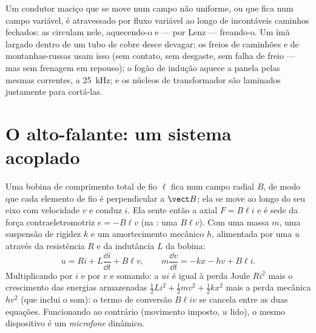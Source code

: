 \begin{example}\label{ex:b1:induction:eddy}
Um condutor maciço que se move num campo não uniforme, ou que fica num campo
variável, é atravessado por fluxo variável ao longo de incontáveis caminhos fechados:
as \emph{} circulam nele, aquecendo-o e --- por Lenz ---
freando-o. Um ímã largado dentro de um tubo de cobre desce devagar; os
freios de caminhões e de montanhas-russas usam isso (sem contato, sem desgaste, sem
falha de freio --- mas sem frenagem em repouso); o fogão de indução aquece
a panela pelas mesmas correntes, a \qty{25}{kHz}; e os núcleos de transformador são
laminados justamente para cortá-las.
\end{example}

\section{O alto-falante: um sistema acoplado}

\begin{proposition}\label{prop:b1:induction:loudspeaker}
Uma bobina de comprimento total de fio $\ell$ fica num campo radial $B$, de modo que
cada elemento de fio é perpendicular a $\vect B$; ela se move ao longo do seu
eixo com velocidade $v$ e conduz $i$. Ela sente então a  axial
$F = B\ell i$ e é sede da força contraeletromotriz $e = -B\ell v$ (na : uma  $B\ell v$). Com uma massa $m$, uma suspensão de
rigidez $k$ e um amortecimento mecânico $h$, alimentada por uma  $u$ através
da resistência $R$ e da indutância $L$ da bobina:
\[
u = Ri + L\frac{\dd i}{\dd t} + B\ell v , \qquad
m\frac{\dd v}{\dd t} = -kx - hv + B\ell i .
\]
Multiplicando por $i$ e por $v$ e somando: a  $ui$
é igual à perda Joule $Ri^2$ mais o crescimento das energias armazenadas
$\tfrac12Li^2 + \tfrac12mv^2 + \tfrac12kx^2$ mais a perda mecânica
$hv^2$ (que inclui o som): o termo de conversão $B\ell iv$ se cancela
entre as duas equações. Funcionando ao contrário (movimento imposto, $u$ lido), o
mesmo dispositivo é um \emph{microfone} dinâmico.
\end{proposition}

